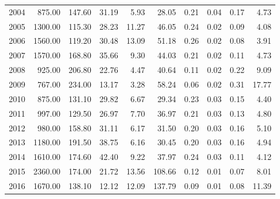 \documentclass{article}
\begin{document}
\begin{table}[H]
\begin{tabular}{rrrrrrrrrr}
  2004 & 875.00 & 147.60 & 31.19 & 5.93 & 28.05 & 0.21 & 0.04 & 0.17 & 4.73 \\ 
  2005 & 1300.00 & 115.30 & 28.23 & 11.27 & 46.05 & 0.24 & 0.02 & 0.09 & 4.08 \\ 
  2006 & 1560.00 & 119.20 & 30.48 & 13.09 & 51.18 & 0.26 & 0.02 & 0.08 & 3.91 \\ 
  2007 & 1570.00 & 168.80 & 35.66 & 9.30 & 44.03 & 0.21 & 0.02 & 0.11 & 4.73 \\ 
  2008 & 925.00 & 206.80 & 22.76 & 4.47 & 40.64 & 0.11 & 0.02 & 0.22 & 9.09 \\ 
  2009 & 767.00 & 234.00 & 13.17 & 3.28 & 58.24 & 0.06 & 0.02 & 0.31 & 17.77 \\ 
  2010 & 875.00 & 131.10 & 29.82 & 6.67 & 29.34 & 0.23 & 0.03 & 0.15 & 4.40 \\ 
  2011 & 997.00 & 129.50 & 26.97 & 7.70 & 36.97 & 0.21 & 0.03 & 0.13 & 4.80 \\ 
  2012 & 980.00 & 158.80 & 31.11 & 6.17 & 31.50 & 0.20 & 0.03 & 0.16 & 5.10 \\ 
  2013 & 1180.00 & 191.50 & 38.75 & 6.16 & 30.45 & 0.20 & 0.03 & 0.16 & 4.94 \\ 
  2014 & 1610.00 & 174.60 & 42.40 & 9.22 & 37.97 & 0.24 & 0.03 & 0.11 & 4.12 \\ 
  2015 & 2360.00 & 174.00 & 21.72 & 13.56 & 108.66 & 0.12 & 0.01 & 0.07 & 8.01 \\ 
  2016 & 1670.00 & 138.10 & 12.12 & 12.09 & 137.79 & 0.09 & 0.01 & 0.08 & 11.39 \\ 
   \hline
\end{tabular}
\end{table}
\end{document}
